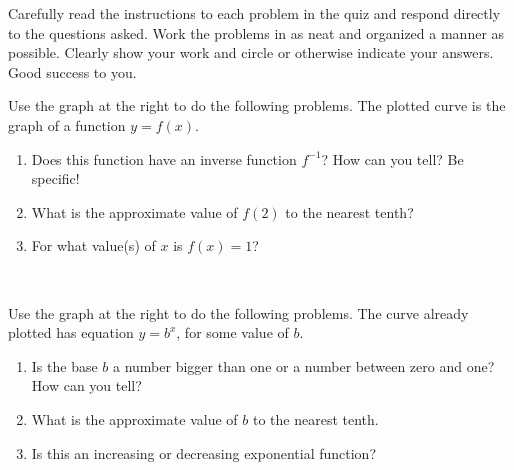 \documentclass[10pt,fleqn]{article}
\begin{document}
Carefully read the instructions to each problem in the quiz and
respond directly to the questions asked. Work the problems in as neat
and organized a manner as possible. Clearly show your work and circle
or otherwise indicate your answers. Good success to you.
\begin{enumerate}
\begin{minipage}[t]{0.5\textwidth}
  \vspace{0pt}
\item Use the graph at the right to do the following
  problems. The plotted curve is the graph of a function $y = f(x)$.
  \begin{enumerate}
    \item Does this function have an inverse function $f^{-1}$? How
      can you tell? Be specific!\\[0.5in]
    \item What is the approximate value of $f(2)$ to the nearest tenth?\\[0.25in]
    \item For what value(s) of $x$ is $f(x) = 1$?
  \end{enumerate}
\end{minipage}
\hfill
\begin{minipage}[t]{0.4\textwidth}
  \vspace{-2ex}
\end{minipage}\\[0.25in]
\begin{minipage}[t]{0.5\textwidth}
  \vspace{0pt}
\item Use the graph at the right to do the following
  problems. The curve already plotted has equation $y = b^x$,
  for some value of $b$.
  \begin{enumerate}
    \item Is the base $b$ a number bigger than one or a number
      between zero and one? How can you tell?\\[0.5in]
    \item What is the approximate value of $b$ to the nearest
      tenth.\\[0.25in]
    \item Is this an increasing or decreasing exponential
      function?

\end{enumerate}
\end{minipage}
\end{enumerate}
\end{document}
